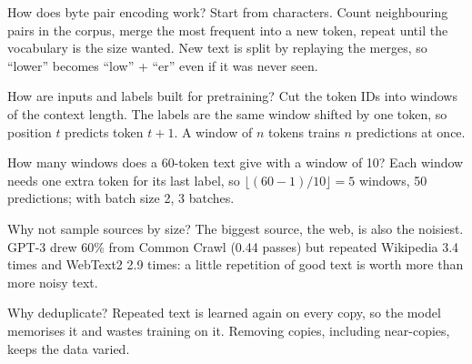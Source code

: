 \begin{iq}[\core]{How does byte pair encoding work?}
Start from characters. Count neighbouring pairs in the corpus, merge the most frequent into a new token, repeat until the vocabulary is the size wanted. New text is split by replaying the merges, so ``lower'' becomes ``low'' + ``er'' even if it was never seen.
\end{iq}

\begin{iq}[\core]{How are inputs and labels built for pretraining?}
Cut the token IDs into windows of the context length. The labels are the same window shifted by one token, so position $t$ predicts token $t+1$. A window of $n$ tokens trains $n$ predictions at once.
\end{iq}

\begin{iq}{How many windows does a 60-token text give with a window of 10?}
Each window needs one extra token for its last label, so $\lfloor (60-1)/10 \rfloor = 5$ windows, 50 predictions; with batch size 2, 3 batches.
\end{iq}

\begin{iq}{Why not sample sources by size?}
The biggest source, the web, is also the noisiest. GPT-3 drew 60\% from Common Crawl (0.44 passes) but repeated Wikipedia 3.4 times and WebText2 2.9 times: a little repetition of good text is worth more than more noisy text.
\end{iq}

\begin{iq}{Why deduplicate?}
Repeated text is learned again on every copy, so the model memorises it and wastes training on it. Removing copies, including near-copies, keeps the data varied.
\end{iq}

